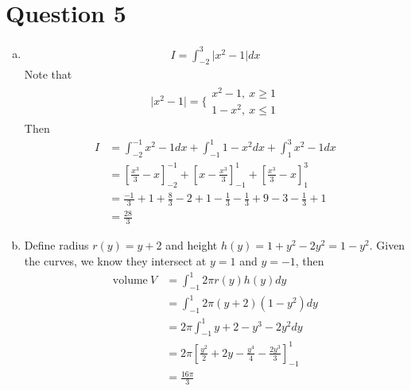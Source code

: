 \documentclass[11pt]{article}
\begin{document}
\section*{Question 5}
\begin{enumerate}[(a)]
    \item 
    \begin{align*}
        I = \int_{-2}^3 \lvert x^2 -1 \rvert dx
    \end{align*}
    Note that 
    \begin{align*}
        \lvert x^2-1 \rvert 
        =\Bigg\{\begin{array}{cc}
             x^2-1, \ x\geq 1  \\
             1-x^2, \ x \leq 1 
        \end{array}
    \end{align*}
    Then 
    \begin{align*}
        I &= \int_{-2}^{-1}x^2-1 dx + \int_{-1}^1 1-x^2 dx + \int_1^3 x^2-1 dx\\
        &= \left[\frac{x^3}{3}-x\right]_{-2}^{-1}+\left[x-\frac{x^3}{3}\right]_{-1}^1+\left[\frac{x^3}{3}-x\right]_1^3\\
        &= \frac{-1}{3}+1+\frac{8}{3}-2+1-\frac{1}{3}-\frac{1}{3}+9-3-\frac{1}{3}+1\\
        &= \frac{28}{3}
    \end{align*}
    \item 
    Define radius $r(y)=y+2$ and height $h(y)=1+y^2-2y^2=1-y^2.$
    Given the curves, we know they intersect at $y=1$ and $y=-1$, then
    \begin{align*}
        \text{volume} \  V &= \int_{-1}^1 2\pi r(y)h(y)dy \\
        &= \int_{-1}^1 2\pi(y+2)(1-y^2)dy \\
        &= 2\pi\int_{-1}^1 y+2-y^3-2y^2 dy\\
        &= 2\pi \left[\frac{y^2}{2}+2y-\frac{y^4}{4}-\frac{2y^3}{3}\right]_{-1}^1\\
        &= \frac{16\pi}{3}
    \end{align*}
\end{enumerate}
\newpage
\end{document}
